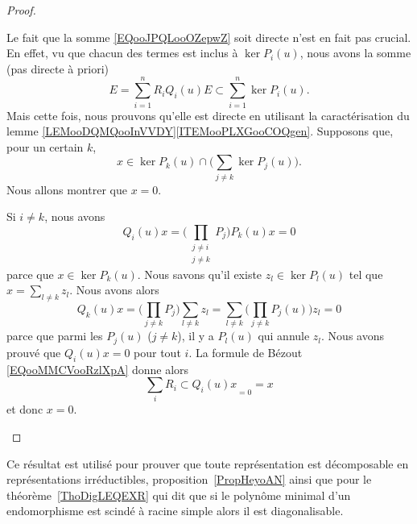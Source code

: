 \begin{proof}
\begin{subproof}
		Le fait que la somme \eqref{EQooJPQLooOZepwZ} soit directe n'est en fait pas crucial. En effet, vu que chacun des termes est inclus à \( \ker P_i(u)\), nous avons la somme (pas directe à priori)
		\begin{equation}
			E=\sum_{i=1}^nR_iQ_i(u)E\subset\sum_{i=1}^n\ker P_i(u).
		\end{equation}
		Mais cette fois, nous prouvons qu'elle est directe en utilisant la caractérisation du lemme \ref{LEMooDQMQooInVVDY}\ref{ITEMooPLXGooCOQgen}. Supposons que, pour un certain \( k\),
		\begin{equation}
			x\in\ker P_k(u)\cap\big( \sum_{j\neq k}\ker P_j(u) \big).
		\end{equation}
		Nous allons montrer que \( x=0\).
		\begin{subproof}
			\spitem[\( Q_i(u)x=0\) si \( i\neq k\)]
			Si \( i\neq k\), nous avons
			\begin{equation}
				Q_i(u)x=\Big( \prod_{\substack{j\neq i\\j\neq k}}P_j \Big)P_k(u)x=0
			\end{equation}
			parce que \( x\in\ker P_k(u)\).
			\spitem[\( Q_k(u)x=0\)]
			Nous savons qu'il existe \( z_l\in\ker P_l(u)\) tel que \( x=\sum_{l\neq k}z_l\). Nous avons alors
			\begin{equation}
				Q_k(u)x=\Big( \prod_{j\neq k}P_j \Big)\sum_{l\neq k}z_l=\sum_{l\neq k}\Big( \prod_{j\neq k}P_j(u) \Big)z_l=0
			\end{equation}
			parce que parmi les \( P_j(u)\) (\( j\neq k\)), il y a \( P_l(u)\) qui annule \( z_l\).
			\spitem[Et finalement]
			Nous avons prouvé que \( Q_i(u)x=0\) pour tout \( i\). La formule de Bézout \eqref{EQooMMCVooRzlXpA} donne alors
			\begin{equation}
				\sum_iR_i\subset{Q_i(u)x}_{=0}=x
			\end{equation}
			et donc \( x=0\).
		\end{subproof}
	\end{subproof}
\end{proof}

\begin{normaltext}
	Ce résultat est utilisé pour prouver que toute représentation est décomposable en représentations irréductibles, proposition~\ref{PropHeyoAN} ainsi que pour le théorème~\ref{ThoDigLEQEXR} qui dit que si le polynôme minimal d'un endomorphisme est scindé à racine simple alors il est diagonalisable.
\end{normaltext}

